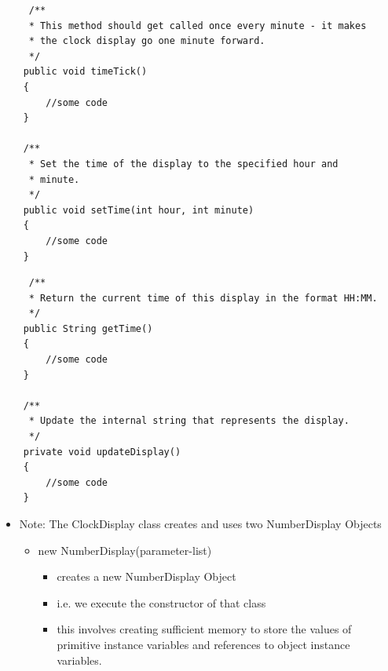 \documentclass{beamer}
\begin{document}
\begin{frame}[fragile]
\tiny
\begin{block}{}
\begin{lstlisting}
     /**
     * This method should get called once every minute - it makes
     * the clock display go one minute forward.
     */
    public void timeTick()
    {
        //some code
    }

    /**
     * Set the time of the display to the specified hour and
     * minute.
     */
    public void setTime(int hour, int minute)
    {
        //some code
    }
\end{lstlisting}
\end{block}

\end{frame}

\begin{frame}[fragile]
\tiny
\begin{block}{}
\begin{lstlisting}
     /**
     * Return the current time of this display in the format HH:MM.
     */
    public String getTime()
    {
        //some code
    }
    
    /**
     * Update the internal string that represents the display.
     */
    private void updateDisplay()
    {
        //some code
    }
\end{lstlisting}
\end{block}

\end{frame}

\begin{frame}

\begin{itemize}
\item Note: The ClockDisplay class creates and uses two NumberDisplay Objects

\begin{itemize}
\item new NumberDisplay(parameter-list)

\begin{itemize}
\item creates a new NumberDisplay Object
\item i.e. we execute the constructor of that class
\item this involves creating sufficient memory to store the values of primitive instance variables and references to
object instance variables.
\end{itemize}
\end{itemize}
\end{itemize}

\end{frame}
\end{document}
